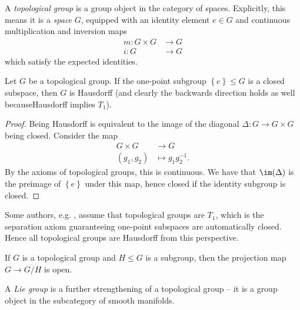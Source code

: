 \documentclass[11pt]{book}
\begin{document}
\begin{definition}\label{def:topological-group} 
A \emph{topological group} is a group object in the category of spaces. Explicitly, this means it is a \emph{space} $G$, equipped with an identity element $e\in G$ and continuous multiplication and inversion maps
\begin{align*}
    m \colon G \times G &\to G \\
    i \colon G &\to G
\end{align*}
which satisfy the expected identities. 
\end{definition}

\begin{proposition} Let $G$ be a topological group. If the one-point subgroup $\left\{ e \right\} \le G$ is a closed subspace, then $G$ is Hausdorff (and clearly the backwards direction holds as well becauseHausdorff implies $T_1$).
\end{proposition}
\begin{proof} Being Hausdorff is equivalent to the image of the diagonal $\Delta \colon G \to G \times G$ being closed. Consider the map
\begin{align*}
    G \times G &\to G \\
    (g_1,g_2) &\mapsto g_1 g_2^{-1}.
\end{align*}
By the axioms of topological groups, this is continuous. We have that $\im(\Delta)$ is the preimage of $\left\{ e \right\}$ under this map, hence closed if the identity subgroup is closed.
\end{proof}

\begin{remark} Some authors, e.g. \cite{Munkres}, assume that topological groups are $T_1$, which is the separation axiom guaranteeing one-point subspaces are automatically closed. Hence all topological groups are Hausdorff from this perspective.
\end{remark}

\begin{exercise}
If $G$ is a topological group and $H \le G$ is a subgroup, then the projection map $G \to G/H$ is open.
\end{exercise}





\begin{example} A \emph{Lie group} is a further strengthening of a topological group -- it is a group object in the subcategory of smooth manifolds.
\end{example}
\end{document}
